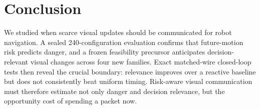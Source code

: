 \documentclass[letterpaper,10pt,conference]{ieeeconf}
\begin{document}
\section{Conclusion}

We studied when scarce visual updates should be communicated for robot
navigation. A sealed 240-configuration evaluation confirms that future-motion
risk predicts danger, and a frozen feasibility precursor anticipates
decision-relevant visual changes across four new families. Exact matched-wire
closed-loop tests then reveal the crucial boundary: relevance improves over a
reactive baseline but does not consistently beat uniform timing. Risk-aware
visual communication must therefore estimate not only danger and decision
relevance, but the opportunity cost of spending a packet now.



\end{document}
